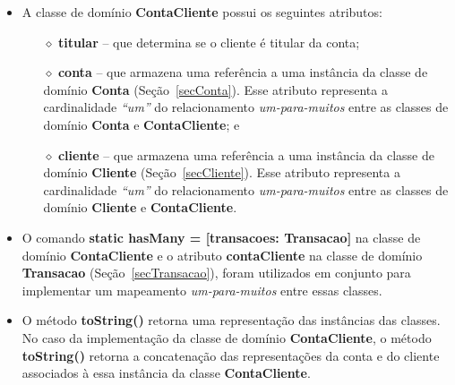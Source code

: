 \begin{itemize}

\item A classe de domínio {\bf ContaCliente} possui os seguintes atributos:

\vspace{0.5cm}

\begin{itemize}

\item[$\diamond$]  {\bf titular}  -- que  determina se  o cliente  é  titular da
  conta; 

\vspace{0.5cm}

\item[$\diamond$] {\bf conta} -- que  armazena uma referência a uma instância da
  classe   de  domínio  {\bf   Conta}  (Seção~\ref{secConta}).    Esse  atributo
  representa a cardinalidade {\em ``um''} do relacionamento {\em um-para-muitos}
  entre as classes de domínio {\bf Conta} e {\bf ContaCliente}; e

\vspace{0.5cm}

\item[$\diamond$] {\bf cliente}  -- que armazena uma referência  a uma instância
  da classe  de domínio  {\bf Cliente} (Seção~\ref{secCliente}).   Esse atributo
  representa a cardinalidade {\em ``um''} do relacionamento {\em um-para-muitos}
  entre as classes de domínio {\bf Cliente} e {\bf ContaCliente}.

\end{itemize}

\vspace{0.5cm}


\item  O comando {\bf  static hasMany  = [transacoes:  Transacao]} na  classe de
  domínio  {\bf ContaCliente}  e  o  atributo {\bf  contaCliente}  na classe  de
  domínio  {\bf  Transacao}   (Seção~\ref{secTransacao}),  foram  utilizados  em
  conjunto  para  implementar um  mapeamento  {\em  um-para-muitos} entre  essas
  classes.

\vspace{0.5cm}

\item O  método {\bf  toString()} retorna uma  representação das  instâncias das
  classes.  No caso da implementação  da classe de domínio {\bf ContaCliente}, o
  método {\bf toString()}  retorna a concatenação das representações  da conta e
  do cliente associados à essa instância da classe {\bf ContaCliente}.

\end{itemize}


